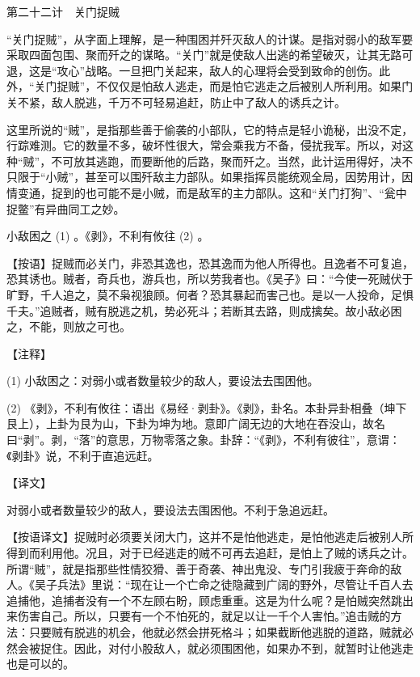 \documentclass[12pt,UTF8]{ctexbook}
\begin{document}
第二十二计　关门捉贼


“关门捉贼”，从字面上理解，是一种围困并歼灭敌人的计谋。是指对弱小的敌军要采取四面包围、聚而歼之的谋略。“关门”就是使敌人出逃的希望破灭，让其无路可退，这是“攻心”战略。一旦把门关起来，敌人的心理将会受到致命的创伤。此外，“关门捉贼”，不仅仅是怕敌人逃走，而是怕它逃走之后被别人所利用。如果门关不紧，敌人脱逃，千万不可轻易追赶，防止中了敌人的诱兵之计。

这里所说的“贼”，是指那些善于偷袭的小部队，它的特点是轻小诡秘，出没不定，行踪难测。它的数量不多，破坏性很大，常会乘我方不备，侵扰我军。所以，对这种“贼”，不可放其逃跑，而要断他的后路，聚而歼之。当然，此计运用得好，决不只限于“小贼”，甚至可以围歼敌主力部队。如果指挥员能统观全局，因势用计，因情变通，捉到的也可能不是小贼，而是敌军的主力部队。这和“关门打狗”、“瓮中捉鳖”有异曲同工之妙。





小敌困之 (1) 。《剥》，不利有攸往 (2) 。

【按语】捉贼而必关门，非恐其逸也，恐其逸而为他人所得也。且逸者不可复追，恐其诱也。贼者，奇兵也，游兵也，所以劳我者也。《吴子》曰：“今使一死贼伏于旷野，千人追之，莫不枭视狼顾。何者？恐其暴起而害己也。是以一人投命，足惧千夫。”追贼者，贼有脱逃之机，势必死斗；若断其去路，则成擒矣。故小敌必困之，不能，则放之可也。





【注释】


(1) 小敌困之：对弱小或者数量较少的敌人，要设法去围困他。

(2) 《剥》，不利有攸往：语出《易经·剥卦》。《剥》，卦名。本卦异卦相叠（坤下艮上），上卦为艮为山，下卦为坤为地。意即广阔无边的大地在吞没山，故名曰“剥”。剥，“落”的意思，万物零落之象。卦辞：“《剥》，不利有彼往”，意谓：《剥卦》说，不利于直追远赶。





【译文】


对弱小或者数量较少的敌人，要设法去围困他。不利于急追远赶。

【按语译文】捉贼时必须要关闭大门，这并不是怕他逃走，是怕他逃走后被别人所得到而利用他。况且，对于已经逃走的贼不可再去追赶，是怕上了贼的诱兵之计。所谓“贼”，就是指那些性情狡猾、善于奇袭、神出鬼没、专门引我疲于奔命的敌人。《吴子兵法》里说：“现在让一个亡命之徒隐藏到广阔的野外，尽管让千百人去追捕他，追捕者没有一个不左顾右盼，顾虑重重。这是为什么呢？是怕贼突然跳出来伤害自己。所以，只要有一个不怕死的，就足以让一千个人害怕。”追击贼的方法：只要贼有脱逃的机会，他就必然会拼死格斗；如果截断他逃脱的道路，贼就必然会被捉住。因此，对付小股敌人，就必须围困他，如果办不到，就暂时让他逃走也是可以的。
\end{document}
